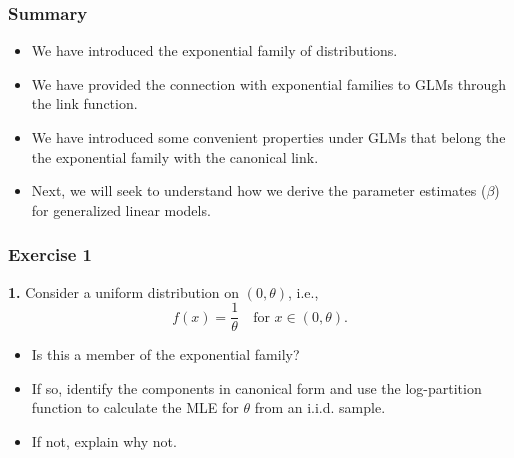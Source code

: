 \documentclass{beamer}
\begin{document}
\begin{frame}
\frametitle{Summary}

\begin{itemize}
\item We have introduced the exponential family of distributions.
\item We have provided the connection with exponential families to GLMs through the link function. 
\item We have introduced some convenient properties under GLMs that belong the the exponential family with the canonical link.
\item Next, we will seek to understand how we derive the parameter estimates ($\beta$) for generalized linear models.
\end{itemize}



\end{frame}



%

\begin{frame}
\frametitle{Exercise 1}
\textbf{1.} Consider a uniform distribution on $(0,\theta)$, i.e., 
\[
f(x)=\frac{1}{\theta}\quad\text{for } x\in (0,\theta).
\]
\begin{itemize}
  \item Is this a member of the exponential family?
  \item If so, identify the components in canonical form and use the log-partition function to calculate the MLE for $\theta$ from an i.i.d. sample.
  \item If not, explain why not.
\end{itemize}
\end{frame}
\end{document}
